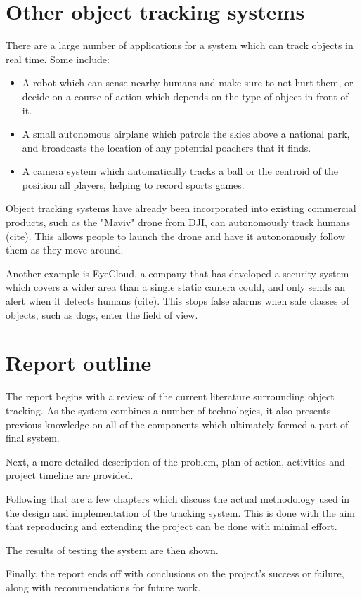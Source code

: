 \section{Other object tracking systems}
There are a large number of applications for a system which can track objects in real time. Some include:

\begin{itemize}
\item A robot which can sense nearby humans and make sure to not hurt them, or decide on a course of action which depends on the type of object in front of it.
\item A small autonomous airplane which patrols the skies above a national park, and broadcasts the location of any potential poachers that it finds.
\item A camera system which automatically tracks a ball or the centroid of the position all players, helping to record sports games.
\end{itemize}

Object tracking systems have already been incorporated into existing commercial products, such as the "Maviv" drone from DJI, can autonomously track humans {\color{red} (cite)}. This allows people to launch the drone and have it autonomously follow them as they move around.

Another example is EyeCloud, a company that has developed a security system which covers a wider area than a single static camera could, and only sends an alert when it detects humans {\color{red} (cite)}. This stops false alarms when safe classes of objects, such as dogs, enter the field of view.




\section{Report outline}

The report begins with a review of the current literature surrounding object tracking. As the system combines a number of technologies, it also presents previous knowledge on all of the components which ultimately formed a part of final system.

Next, a more detailed description of the problem, plan of action, activities and project timeline are provided.

Following that are a few chapters which discuss the actual methodology used in the design and implementation of the tracking system. This is done with the aim that reproducing and extending the project can be done with minimal effort.

The results of testing the system are then shown.

Finally, the report ends off with conclusions on the project's success or failure, along with recommendations for future work.

